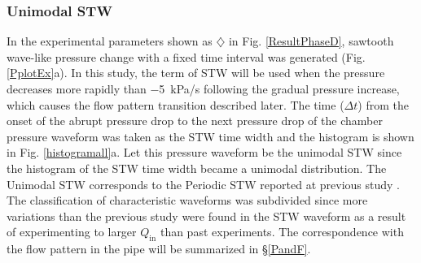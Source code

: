 \documentclass[aps,pre,preprint,groupedaddress,showkeys]{revtex4-2}
\begin{document}
\subsubsection{Unimodal STW}
In the experimental parameters shown as $\diamondsuit$ in Fig. \ref{ResultPhaseD}, sawtooth wave-like pressure change with a fixed time interval was generated (Fig. \ref{PplotEx}a).
In this study, the term of STW will be used when the pressure decreases more rapidly than \SI{-5}{kPa/s} following the gradual pressure increase, which causes the flow pattern transition described later.
The time ($\Delta t$) from the onset of the abrupt pressure drop to the next pressure drop of the chamber pressure waveform was taken as the STW time width and the histogram is shown in Fig. \ref {histogramall}a.
Let this pressure waveform be the unimodal STW since the histogram of the STW time width became a unimodal distribution.
The Unimodal STW corresponds to the Periodic STW reported at previous study \citep{kanno2018}.
The classification of characteristic waveforms was subdivided since more variations than the previous study were found in the STW waveform as a result of experimenting to larger $Q_\mathrm{in}$ than past experiments.
The correspondence with the flow pattern in the pipe will be summarized in \S \ref{PandF}.
\end{document}

